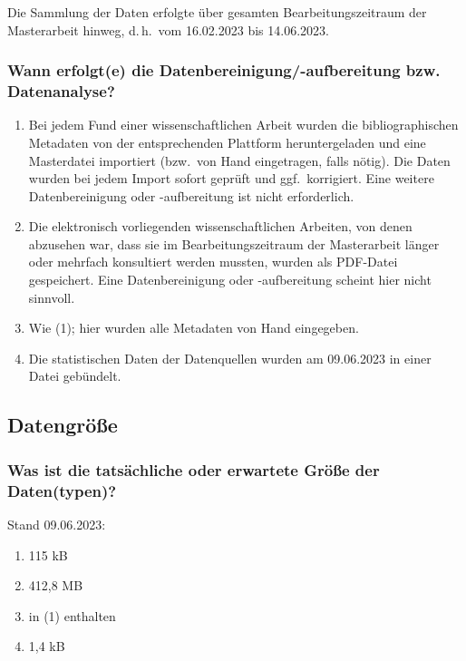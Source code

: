 Die Sammlung der Daten erfolgte über gesamten Bearbeitungszeitraum der Masterarbeit hinweg, d.\,h.\ vom 16.02.2023 bis 14.06.2023.

\subsubsection{Wann erfolgt(e) die Datenbereinigung/-aufbereitung bzw. Datenanalyse?}

\begin{enumerate}[(1)]
  \item
    Bei jedem Fund einer wissenschaftlichen Arbeit wurden die bibliographischen Metadaten von der entsprechenden Plattform heruntergeladen
    und eine Masterdatei importiert (bzw.\ von Hand eingetragen, falls nötig). Die Daten wurden bei jedem Import sofort geprüft und ggf.\
    korrigiert. Eine weitere Datenbereinigung oder -aufbereitung ist nicht erforderlich.
  \item
    Die elektronisch vorliegenden wissenschaftlichen Arbeiten, von denen abzusehen war, dass sie im Bearbeitungszeitraum der Masterarbeit
    länger oder mehrfach konsultiert werden mussten, wurden als PDF-Datei gespeichert.
    Eine Datenbereinigung oder -aufbereitung scheint hier nicht sinnvoll.
  \item
    Wie (1); hier wurden alle Metadaten von Hand eingegeben.
  \item
    Die statistischen Daten der Datenquellen wurden am 09.06.2023 in einer Datei gebündelt.
\end{enumerate}

\subsection{Datengröße}

\subsubsection{Was ist die tatsächliche oder erwartete Größe der Daten(typen)?}

Stand 09.06.2023:
%
\begin{enumerate}[(1)]
  \item
    115 kB
  \item
    412,8 MB
  \item
    in (1) enthalten
  \item
    1,4 kB
\end{enumerate}

